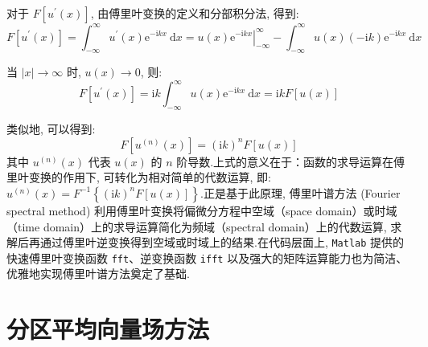 对于 $F\left[u^{\prime}(x)\right]$, 由傅里叶变换的定义和分部积分法, 得到:
\begin{equation}
    F\left[u^{\prime}(x)\right] = \int_{-\infty}^{\infty} u^{\prime}(x) \mathrm{e}^{-\mathrm{i} k x} \mathrm{~d} x = \left.u(x) \mathrm{e}^{-\mathrm{i} k x}\right|_{-\infty}^{\infty} - \int_{-\infty}^{\infty} u(x)(-\mathrm{i} k) \mathrm{e}^{-\mathrm{i} k x} \mathrm{~d} x \label{eq:3-7}
\end{equation}

当 $\mid x\mid  \rightarrow \infty$ 时, $u(x) \rightarrow 0$, 则:
\begin{equation}
    F\left[u^{\prime}(x)\right] = \mathrm{i} k \int_{-\infty}^{\infty} u(x) \mathrm{e}^{-\mathrm{i} k x} \mathrm{~d} x = \mathrm{i} k F[u(x)] \label{eq:3-8}
\end{equation}

类似地, 可以得到:
\begin{equation}
    F\left[u^{(n)}(x)\right] = (\mathrm{i} k)^n F[u(x)] \label{eq:3-9}
\end{equation}
其中 $u^{(n)}(x)$ 代表 $u(x)$ 的 $n$ 阶导数.上式的意义在于：函数的求导运算在傅里叶变换的作用下, 可转化为相对简单的代数运算, 即: $u^{(n)}(x) = F^{-1}\left\{(\mathrm{i} k)^n F[u(x)]\right\}$.正是基于此原理, 傅里叶谱方法 (Fourier spectral method) 利用傅里叶变换将偏微分方程中空域（space domain）或时域（time domain）上的求导运算简化为频域（spectral domain）上的代数运算, 求解后再通过傅里叶逆变换得到空域或时域上的结果.在代码层面上, \texttt{Matlab} 提供的快速傅里叶变换函数 \texttt{fft}、逆变换函数 \texttt{ifft} 以及强大的矩阵运算能力也为简洁、优雅地实现傅里叶谱方法奠定了基础.


\section{分区平均向量场方法}


